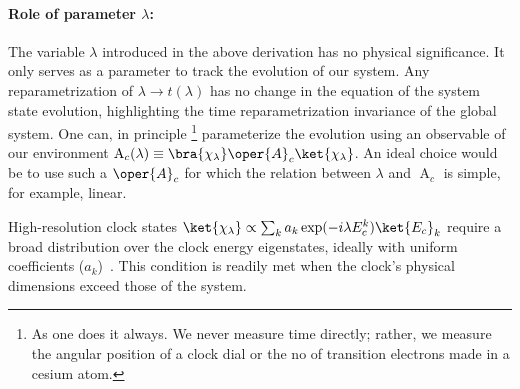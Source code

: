 \paragraph{Role of parameter \(\lambda\):} The variable \(\lambda\) introduced 
in the above derivation has no physical significance. It only serves as a parameter
to track the evolution of our system. Any reparametrization of \(\lambda \to t(\lambda)\) 
has no change in the equation of the system state evolution, highlighting
the time reparametrization invariance of the global system. One can, in principle 
\footnote{As one does it always. We never measure time directly; rather, we measure
the angular position of a clock dial or the no of transition electrons made in a cesium atom.}
 parameterize the evolution using an observable of our environment 
 \(\operatorname{A}_c(\lambda)\equiv \bra{\chi_\lambda}\oper{A}_c\ket{\chi_\lambda}\). 
 An ideal choice would be to use such a $\oper{A}_c$ for which the relation between $\lambda $ and $\operatorname{A}_c$ is simple, for example, linear.

High-resolution clock states $\ket{\chi_\lambda} \propto \sum_k a_k \exp (-i\lambda E_c ^k)\ket{E_c}_k$ require a broad 
distribution over the clock energy eigenstates, ideally with uniform coefficients 
($a_k$)~\cite{Gemsheim:2023izg, Smith:2017pwx}. This condition is readily met when the clock's physical dimensions exceed those of the system.


